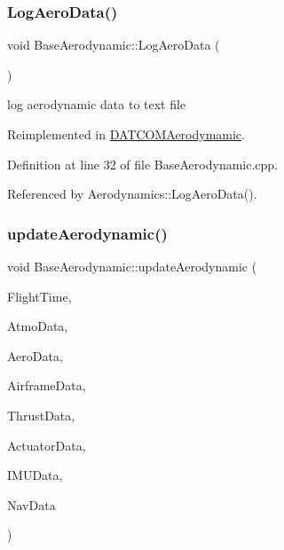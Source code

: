 \mbox{\label{class_base_aerodynamic_abaea76739e197627a6d09cff5b68af83}} 
\subsubsection{\texorpdfstring{Log\+Aero\+Data()}{LogAeroData()}}
{\footnotesize\ttfamily void Base\+Aerodynamic\+::\+Log\+Aero\+Data (\begin{DoxyParamCaption}{ }\end{DoxyParamCaption})\hspace{0.3cm}{\ttfamily [virtual]}}



log aerodynamic data to text file 



Reimplemented in \hyperlink{class_d_a_t_c_o_m_aerodymamic_a84ab90acbbec700e0b06272bf95cf932}{D\+A\+T\+C\+O\+M\+Aerodymamic}.



Definition at line 32 of file Base\+Aerodynamic.\+cpp.



Referenced by Aerodynamics\+::\+Log\+Aero\+Data().

\mbox{\label{class_base_aerodynamic_a8a417495c896359b2ee74f5c1c8c08f7}} 
\subsubsection{\texorpdfstring{update\+Aerodynamic()}{updateAerodynamic()}}
{\footnotesize\ttfamily void Base\+Aerodynamic\+::update\+Aerodynamic (\begin{DoxyParamCaption}\item[{\hyperlink{group___tools_ga3f1431cb9f76da10f59246d1d743dc2c}{Float64}}]{Flight\+Time,  }\item[{Atmosphere\+Struct \&}]{Atmo\+Data,  }\item[{Aerodynamic\+Struct \&}]{Aero\+Data,  }\item[{Airframe\+Struct \&}]{Airframe\+Data,  }\item[{Thrust\+Struct \&}]{Thrust\+Data,  }\item[{Actuator\+Struct \&}]{Actuator\+Data,  }\item[{I\+M\+U\+Struct \&}]{I\+M\+U\+Data,  }\item[{Navigation\+Struct \&}]{Nav\+Data }\end{DoxyParamCaption})\hspace{0.3cm}{\ttfamily [virtual]}}



